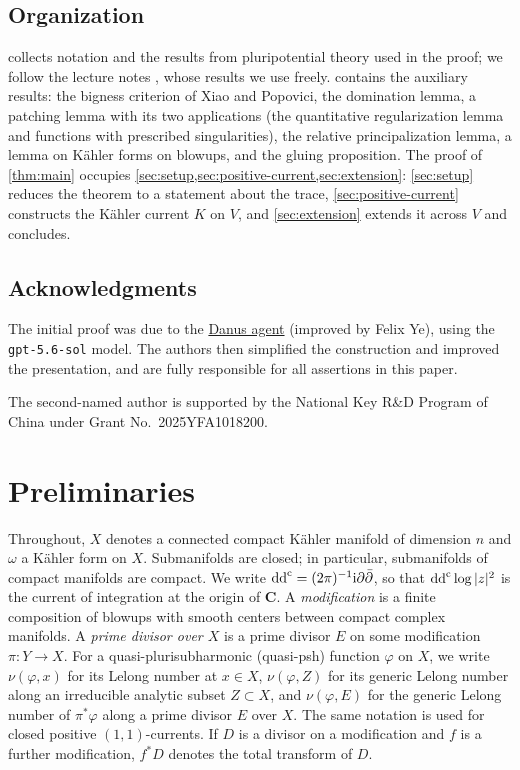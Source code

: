 \documentclass[11pt,a4paper]{amsart}
\theoremstyle{definition}
\begin{document}
\subsection*{Organization}
 collects notation and the results from pluripotential
theory used in the proof; we follow the lecture notes \cite{XiaSGPT},
whose results we use freely.  contains the auxiliary
results: the bigness criterion of Xiao and Popovici, the domination lemma,
a patching lemma with its two applications (the quantitative
regularization lemma and functions with prescribed singularities), the
relative principalization lemma, a lemma on K\"ahler forms on blowups,
and the gluing proposition. The proof of \cref{thm:main} occupies
\cref{sec:setup,sec:positive-current,sec:extension}:
\cref{sec:setup} reduces the theorem to a statement about the trace,
\cref{sec:positive-current} constructs the K\"ahler current $K$ on $V$,
and \cref{sec:extension} extends it across $V$ and concludes.

\subsection*{Acknowledgments}
The initial proof was due to the
\href{https://github.com/frenzymath/Danus}{Danus agent} (improved by Felix
Ye), using the \texttt{gpt-5.6-sol} model. The authors then simplified
the construction and improved the presentation, and are fully responsible
for all assertions in this paper.

The second-named author is supported by the National Key R\&D Program
of China under Grant No.~2025YFA1018200.

\section{Preliminaries}\label{sec:prelim}

Throughout, $X$ denotes a connected compact K\"ahler manifold of
dimension $n$ and $\omega$ a K\"ahler form on $X$. Submanifolds are
closed; in particular, submanifolds of compact manifolds are compact. We
write $\mathrm{dd}^{\mathrm{c}}=(2\pi)^{-1}\mathrm{i}\partial\bar\partial$, so that
$\mathrm{dd}^{\mathrm{c}}\log|z|^2$ is the current of integration at the origin of
$\mathbf C$. A \emph{modification} is a finite composition of blowups
with smooth centers between compact complex manifolds. A \emph{prime
divisor over $X$} is a prime divisor $E$ on some modification
$\pi\colon Y\to X$. For a quasi-plurisubharmonic (quasi-psh) function
$\varphi$ on $X$, we write $\nu(\varphi,x)$ for its Lelong number at
$x\in X$, $\nu(\varphi,Z)$ for its generic Lelong number along an
irreducible analytic subset $Z\subset X$, and $\nu(\varphi,E)$ for the
generic Lelong number of $\pi^*\varphi$ along a prime divisor $E$ over
$X$. The same notation is used for closed positive $(1,1)$-currents.
If $D$ is a divisor on a modification and $f$ is a further modification,
$f^*D$ denotes the total transform of $D$.
\end{document}
